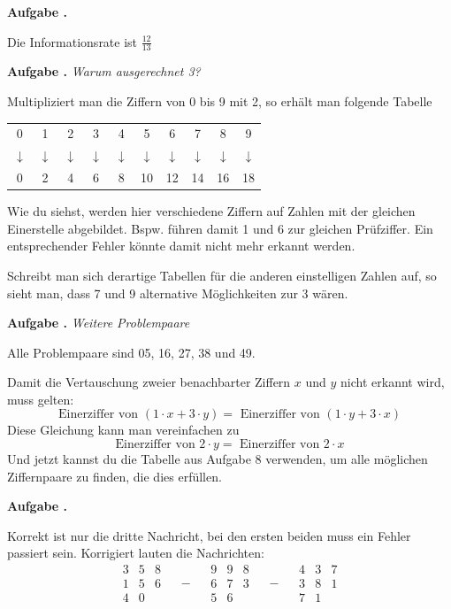 \documentclass[a4paper,ngerman,12pt]{scrartcl}
\theoremstyle{definition}
\theoremstyle{plain}
\theoremstyle{remark}
\newlength{\aufgabenskip}
\newcounter{aufgabennummer}
\newenvironment{aufgabe}[1]{
	\addtocounter{aufgabennummer}{1}
	\textbf{Aufgabe \theaufgabennummer.} \emph{#1} \par
}{\vspace{\aufgabenskip}}
\begin{document}
\begin{aufgabe}{}
	Die Informationsrate ist $\frac{12}{13}$
\end{aufgabe}

\begin{aufgabe}{Warum ausgerechnet 3?}
	Multipliziert man die Ziffern von 0 bis 9 mit 2, so erhält man folgende Tabelle
	\begin{center}
		\begin{tabular}{cccccccccc}
			0 & 1 & 2 & 3 & 4 & 5 & 6 & 7 & 8 & 9 \\
			$\downarrow$ & $\downarrow$ & $\downarrow$ & $\downarrow$ & $\downarrow$ & $\downarrow$ & $\downarrow$ & $\downarrow$ & $\downarrow$ & $\downarrow$ \\
			0 & 2 & 4 & 6 & 8 & 10 & 12 & 14 & 16 & 18
		\end{tabular}
	\end{center}
	Wie du siehst, werden hier verschiedene Ziffern auf Zahlen mit der gleichen Einerstelle abgebildet. Bspw. führen damit 1 und 6 zur gleichen Prüfziffer. Ein entsprechender Fehler könnte damit nicht mehr erkannt werden.
	
	Schreibt man sich derartige Tabellen für die anderen einstelligen Zahlen auf, so sieht man, dass 7 und 9 alternative Möglichkeiten zur 3 wären.
\end{aufgabe}

\begin{aufgabe}{Weitere Problempaare}
	Alle Problempaare sind 05, 16, 27, 38 und 49.
	
	Damit die Vertauschung zweier benachbarter Ziffern $x$ und $y$ nicht erkannt wird, muss gelten: 
		\[\text{Einerziffer von }(1\cdot x + 3\cdot y) = \text{ Einerziffer von }(1\cdot y + 3\cdot x)\]
	Diese Gleichung kann man vereinfachen zu 
		\[\text{Einerziffer von }2\cdot y = \text{ Einerziffer von }2\cdot x\]
	Und jetzt kannst du die Tabelle aus Aufgabe 8 verwenden, um alle möglichen Ziffernpaare zu finden, die dies erfüllen.
\end{aufgabe}

\begin{aufgabe}{}
	Korrekt ist nur die dritte Nachricht, bei den ersten beiden muss ein Fehler passiert sein. Korrigiert lauten die Nachrichten:
	\[\begin{array}{ccc}3 & 5 & 8\\1 & 5 & 6 \\ 4 & 0 &\end{array} \quad-\quad \begin{array}{ccc}9 & 9 & 8\\6 & 7 & 3 \\ 5 & 6 &\end{array} \quad-\quad \begin{array}{ccc}4 & 3 & 7\\3 & 8 & 1 \\ 7 & 1 &\end{array}\]
\end{aufgabe}
\end{document}
